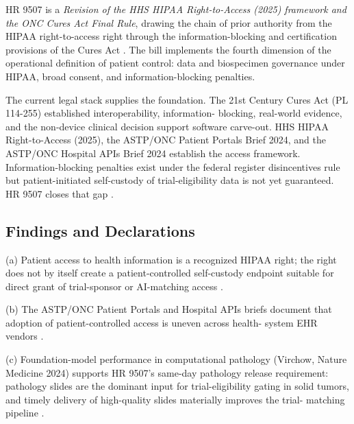 
HR 9507 is a \textit{Revision of the HHS HIPAA Right-to-Access (2025)
framework and the ONC Cures Act Final Rule}, drawing the chain of
prior authority from the HIPAA right-to-access right through the
information-blocking and certification provisions of the Cures Act
\cite{hhs_right_to_access_2025, onc_cures_act_final_rule_page,
federal_register_info_blocking_disincentives_2024}. The bill
implements the fourth dimension of the operational definition of
patient control: data and biospecimen governance under HIPAA, broad
consent, and information-blocking penalties.

The current legal stack supplies the foundation. The 21st Century
Cures Act (PL 114-255) established interoperability, information-
blocking, real-world evidence, and the non-device clinical decision
support software carve-out. HHS HIPAA Right-to-Access (2025), the
ASTP/ONC Patient Portals Brief 2024, and the ASTP/ONC Hospital APIs
Brief 2024 establish the access framework. Information-blocking
penalties exist under the federal register disincentives rule but
patient-initiated self-custody of trial-eligibility data is not yet
guaranteed. HR 9507 closes that gap
\cite{rank1_cures_act_2016, onc_cures_act_final_rule_page,
hhs_right_to_access_2025, astp_onc_patient_portals_apps_2024,
astp_onc_hospital_apis_2024,
federal_register_info_blocking_disincentives_2024}.

\subsection{Findings and Declarations}

(a) Patient access to health information is a recognized HIPAA
right; the right does not by itself create a patient-controlled
self-custody endpoint suitable for direct grant of trial-sponsor or
AI-matching access \cite{hhs_right_to_access_2025}.

(b) The ASTP/ONC Patient Portals and Hospital APIs briefs document
that adoption of patient-controlled access is uneven across health-
system EHR vendors \cite{astp_onc_patient_portals_apps_2024,
astp_onc_hospital_apis_2024}.

(c) Foundation-model performance in computational pathology
(Virchow, Nature Medicine 2024) supports HR 9507's same-day
pathology release requirement: pathology slides are the dominant
input for trial-eligibility gating in solid tumors, and timely
delivery of high-quality slides materially improves the trial-
matching pipeline \cite{vorontsov2024virchow}.

